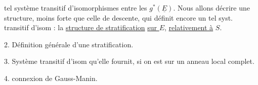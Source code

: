 tel système transitif d'isomorphismes entre les $g^*(\underline E)$. Nous allons décrire une structure,  moins forte que celle de descente, qui définit encore un tel syst. transitif d'isom : la \uline{structure de stratification} \uline{sur $E$}, \uline{relativement à} $S$.

2. Définition générale d'une stratification. 

3. Système transitif d'isom qu'elle fournit, si on est sur un anneau local complet.

4.   connexion de Gauss-Manin.

